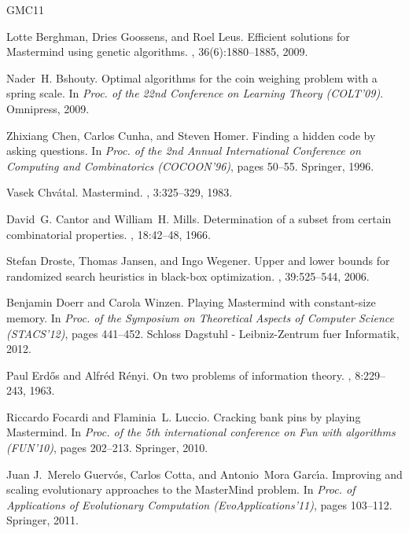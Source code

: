 \documentclass[english,a4paper,11pt]{article}
\begin{document}
%
%
\begin{thebibliography}{GMC11}

Lotte Berghman, Dries Goossens, and Roel Leus.
\newblock Efficient solutions for {M}astermind using genetic algorithms.
, 36(6):1880--1885, 2009.

Nader~H. Bshouty.
\newblock Optimal algorithms for the coin weighing problem with a spring scale.
\newblock In {\em Proc. of the 22nd Conference on Learning Theory (COLT'09)}.
  Omnipress, 2009.

Zhixiang Chen, Carlos Cunha, and Steven Homer.
\newblock Finding a hidden code by asking questions.
\newblock In {\em Proc. of the 2nd Annual International Conference on Computing
  and Combinatorics (COCOON'96)}, pages 50--55. Springer, 1996.

Vasek Chv{\'a}tal.
\newblock Mastermind.
, 3:325--329, 1983.

David~G. Cantor and William~H. Mills.
\newblock Determination of a subset from certain combinatorial properties.
, 18:42--48, 1966.

Stefan Droste, Thomas Jansen, and Ingo Wegener.
\newblock Upper and lower bounds for randomized search heuristics in black-box
  optimization.
, 39:525--544, 2006.

Benjamin Doerr and Carola Winzen.
\newblock Playing {M}astermind with constant-size memory.
\newblock In {\em Proc. of the Symposium on Theoretical Aspects of Computer
  Science (STACS'12)}, pages 441--452. Schloss Dagstuhl - Leibniz-Zentrum fuer
  Informatik, 2012.

Paul Erd{\H{o}}s and Alfr{\'e}d R{\'e}nyi.
\newblock On two problems of information theory.
, 8:229--243, 1963.

Riccardo Focardi and Flaminia~L. Luccio.
\newblock Cracking bank pins by playing {M}astermind.
\newblock In {\em Proc. of the 5th international conference on Fun with
  algorithms (FUN'10)}, pages 202--213. Springer, 2010.

Juan J.~Merelo Guerv{\'o}s, Carlos Cotta, and Antonio~Mora Garc\'{\i}a.
\newblock Improving and scaling evolutionary approaches to the {M}aster{M}ind
  problem.
\newblock In {\em Proc. of Applications of Evolutionary Computation
  (EvoApplications'11)}, pages 103--112. Springer, 2011.


\end{thebibliography}
\end{document}
